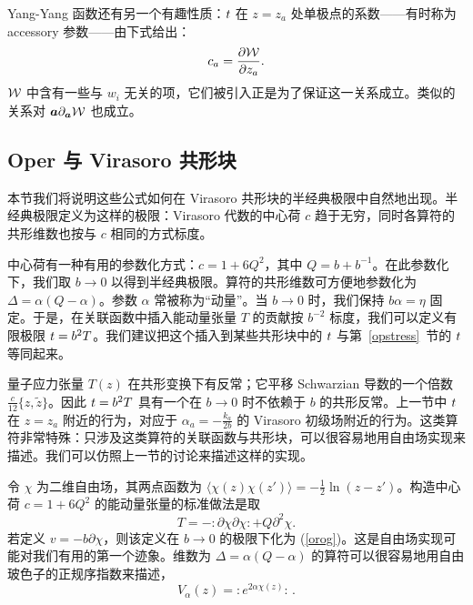 Yang-Yang 函数还有另一个有趣性质：${{t}}$ 在 $z=z_a$ 处单极点的系数——有时称为 accessory 参数——由下式给出：
\begin{equation}
c_a = \frac{\partial {\mathcal W}}{\partial z_a}.
\end{equation}
${\mathcal W}$ 中含有一些与 $w_i$ 无关的项，它们被引入正是为了保证这一关系成立。类似的关系对 ${\boldsymbol{a}} \partial_{\boldsymbol{a}} {\mathcal W}$ 也成立。

\subsection{Oper 与 Virasoro 共形块}\label{opbl}



本节我们将说明这些公式如何在 Virasoro 共形块的半经典极限中自然地出现。半经典极限定义为这样的极限：Virasoro 代数的中心荷 $c$ 趋于无穷，同时各算符的共形维数也按与 $c$ 相同的方式标度。

中心荷有一种有用的参数化方式：$c=1+6 Q^2$，其中 $Q=b + b^{-1}$。在此参数化下，我们取 $b \to 0$ 以得到半经典极限。算符的共形维数可方便地参数化为 $\Delta = \alpha(Q-\alpha)$。参数 $\alpha$ 常被称为“动量”。当 $b\to 0$ 时，我们保持 $b \alpha=\eta$ 固定。于是，在关联函数中插入能动量张量 $T$ 的贡献按 $b^{-2}$ 标度，我们可以定义有限极限 ${{t}} = b^2 T$。我们建议把这个插入到某些共形块中的 ${{t}}$ 与第~\ref{opstress}~节的 ${{t}}$ 等同起来。

量子应力张量 $T(z)$ 在共形变换下有反常；它平移 Schwarzian 导数的一个倍数 $\frac{c}{12} \{z,\tilde z\}$。因此 ${{t}}=b^2T$ 具有一个在 $b\to 0$ 时不依赖于 $b$ 的共形反常。上一节中 ${{t}}$ 在 $z=z_a$ 附近的行为，对应于 $\alpha_a = - \frac{k_a}{2b}$ 的 Virasoro 初级场附近的行为。这类算符非常特殊：只涉及这类算符的关联函数与共形块，可以很容易地用自由场实现来描述。我们可以仿照上一节的讨论来描述这样的实现。

令 $\chi$ 为二维自由场，其两点函数为 $\langle\chi(z)\chi(z')\rangle=-\frac{1}{2} \ln(z-z')$。构造中心荷 $c=1+6 Q^2$ 的能动量张量的标准做法是取
\begin{equation}
T = - :\partial \chi \partial\chi: + Q \partial^2 \chi.
\end{equation}
若定义 $v=-b \partial \chi$，则该定义在 $b \to 0$ 的极限下化为 (\ref{orog})。这是自由场实现可能对我们有用的第一个迹象。维数为 $\Delta = \alpha(Q-\alpha)$ 的算符可以很容易地用自由玻色子的正规序指数来描述，
\begin{equation}
V_{\alpha}(z) = :e^{2\alpha \chi(z)}:\, .
\end{equation}

